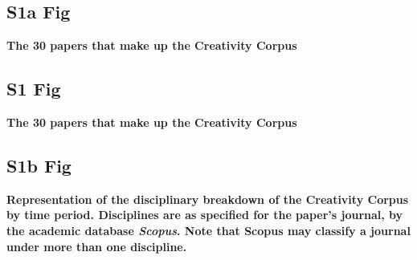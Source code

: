 \documentclass[10pt,letterpaper]{article}
\begin{document}

\subsection*{S1a Fig}\label{S1a_Fig}
{\bf The 30 papers that make up the Creativity Corpus} 

\subsection*{S1 Fig}\label{S1_Fig}
{\bf The 30 papers that make up the Creativity Corpus} 

\subsection*{S1b Fig}
\label{S1b_Fig}
{\bf Representation of the disciplinary breakdown of the Creativity Corpus by time period. Disciplines are as specified for the paper's journal, by the academic database {\em Scopus}. Note that Scopus may classify a journal under more than one discipline.} 
\end{document}
